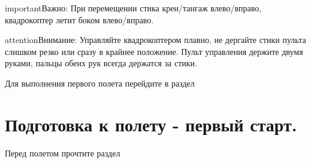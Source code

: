 \documentclass[a4paper,10pt,russian]{sphinxmanual}
\begin{document}


\begin{sphinxadmonition}{important}{Важно:}
При перемещении стика крен/тангаж влево/вправо, квадрокоптер летит боком влево/вправо.
\end{sphinxadmonition}

\begin{sphinxadmonition}{attention}{Внимание:}
Управляйте квадрокоптером плавно, не дергайте стики пульта слишком резко или сразу в крайнее положение. Пульт управления держите двумя руками, пальцы обеих рук всегда держатся за стики.
\end{sphinxadmonition}

Для выполнения первого полета перейдите в раздел {\hyperref[\detokenize{flight/flight_preparation::doc}]{}}


\section{Подготовка к полету - первый старт.}
\label{\detokenize{flight/flight_preparation:id1}}\label{\detokenize{flight/flight_preparation::doc}}
Перед полетом прочтите раздел {\hyperref[\detokenize{flight/rc_control::doc}]{}}
\end{document}

